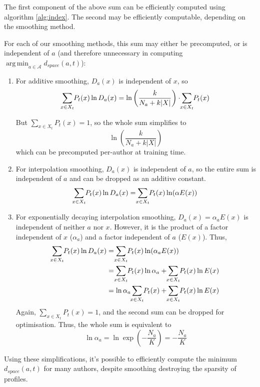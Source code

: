 \documentclass[twocolumn,10pt]{article}
\DeclareMathOperator*{\argmin}{arg\,min}
\begin{document}
The first component of the above sum can be efficiently
computed using algorithm \ref{alg:index}. The second may be
efficiently computable, depending on the smoothing method.

For each of our smoothing methods, this sum may either be
precomputed, or is independent of $a$ (and therefore unnecessary
in computing $\argmin_{a \in \mathcal{A}} d_{space}(a, t)$):

\begin{enumerate}[label=\roman*.]
\item
For additive smoothing, $D_a(x)$ is independent of $x$, so
$$
\smashoperator{\sum_{x \in X_t}} P_t(x) \ln D_a(x)
=
\ln\left(\frac{k}{N_a + k|X|}\right)\cdot\smashoperator{\sum_{x \in X_t}} P_t(x)
$$

But $\sum_{x \in X_t} P_t(x) = 1$, so the whole sum simplifies
to
$$
\ln\left(\frac{k}{N_a + k|X|}\right)
$$
which can be precomputed per-author at training time.

\item
For interpolation smoothing, $D_a(x)$ is independent of $a$, so
the entire sum is independent of $a$ and can be dropped as an
additive constant.
$$
\smashoperator{\sum_{x \in X_t}} P_t(x) \ln D_a(x)
=
\smashoperator{\sum_{x \in X_t}} P_t(x) \ln (\alpha E(x))
$$

\item
For exponentially decaying interpolation smoothing,
$D_a(x)=\alpha_a E(x)$ is independent of neither $a$ nor $x$.
However, it is the product of a factor independent of $x$ ($\alpha_a$)
and a factor independent of $a$ ($E(x)$). Thus,
\begin{align*}
\smashoperator{\sum_{x \in X_t}} P_t(x) \ln D_a(x)
&=  \smashoperator{\sum_{x \in X_t}} P_t(x) \ln (\alpha_a E(x))
\\
&=  \smashoperator{\sum_{x \in X_t}} P_t(x) \ln \alpha_a
    +
    \smashoperator{\sum_{x \in X_t}} P_t(x) \ln E(x)
\\
&=  \ln \alpha_a \smashoperator{\sum_{x \in X_t}} P_t(x)
    +
    \smashoperator{\sum_{x \in X_t}} P_t(x) \ln E(x)
\end{align*}
Again, $\sum_{x \in X_t} P_t(x) = 1$, and the second sum can be
dropped for optimisation. Thus, the whole sum is
equivalent to
$$
\ln \alpha_a
=
\ln \exp\left(-\frac{N_a}{K}\right)
= 
-\frac{N_a}{K}
$$
\end{enumerate}

Using these simplifications, it's possible to efficiently
compute the minimum $d_{space}(a, t)$ for many authors,
despite smoothing destroying the sparsity of profiles.
\end{document}
